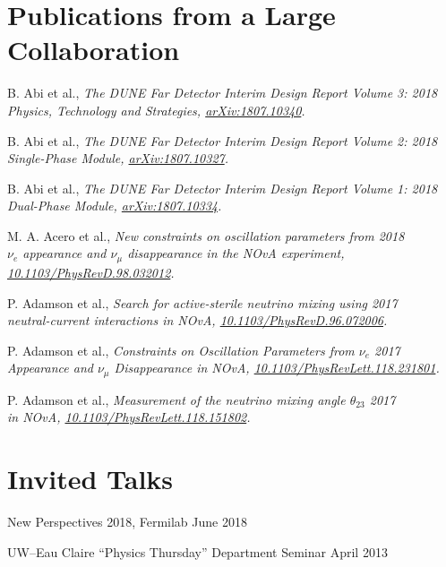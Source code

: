 \documentclass[11pt]{cv}
\begin{document}
\begin{cv}
\section{Publications from a Large Collaboration}
\begin{etaremune}
  \item B. Abi et al., \it The DUNE Far Detector Interim Design Report Volume 3: \rm \hfill 2018 \\
  \it Physics, Technology and Strategies, \rm \href{https://arxiv.org/abs/1807.10340}{arXiv:1807.10340}.
  \item B. Abi et al., \it The DUNE Far Detector Interim Design Report Volume 2: \rm \hfill 2018 \\
  \it Single-Phase Module, \rm \href{https://arxiv.org/abs/1807.10327}{arXiv:1807.10327}.
  \item B. Abi et al., \it The DUNE Far Detector Interim Design Report Volume 1: \rm \hfill 2018 \\
  \it Dual-Phase Module, \rm \href{https://arxiv.org/abs/1807.10334}{arXiv:1807.10334}.
  \item M. A. Acero et al., \it New constraints on oscillation parameters from \rm \hfill 2018 \\
  \it $\nu_e$ appearance and $\nu_\mu$ disappearance in the NOvA experiment, \rm \\
  \href{https://doi.org/10.1103/PhysRevD.98.032012}{10.1103/PhysRevD.98.032012}.
  \item P. Adamson et al., \it Search for active-sterile neutrino mixing using \rm \hfill 2017 \\
  \it neutral-current interactions in NOvA, \rm \href{https://doi.org/10.1103/PhysRevD.96.072006}{10.1103/PhysRevD.96.072006}.
  \item P. Adamson et al., \it Constraints on Oscillation Parameters from $\nu_e$ \rm \hfill 2017 \\
  \it  Appearance and $\nu_\mu$ Disappearance in NOvA, \rm \href{https://doi.org/10.1103/PhysRevLett.118.231801}{10.1103/PhysRevLett.118.231801}.
  \item P. Adamson et al., \it Measurement of the neutrino mixing angle $\theta_{23}$ \rm \hfill 2017 \\
  \it in NOvA, \rm \href{https://doi.org/10.1103/PhysRevLett.118.151802}{10.1103/PhysRevLett.118.151802}.
\end{etaremune}


\section{Invited Talks}
\begin{etaremune}
  \item New Perspectives 2018, Fermilab \hfill June 2018
  \item UW--Eau Claire ``Physics Thursday'' Department Seminar \hfill April 2013
\end{etaremune}



\end{cv}
\end{document}
